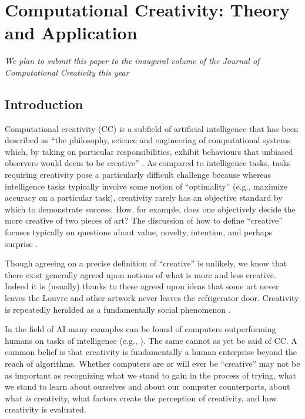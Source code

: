 \documentclass[phd,electronic,oneside,twosidetoc,letterpaper,chaptercenter,parttop,lol,lof,lot]{byumsphd}
\begin{document}
\chapter{Computational Creativity: Theory and Application}

\emph{We plan to submit this paper to the inaugural volume of the Journal of Computational Creativity this year}

\section{Introduction}

Computational creativity (CC) is a subfield of artificial intelligence that has been described as ``the philosophy, science and engineering of computational systems which, by taking on particular responsibilities, exhibit behaviours that unbiased observers would deem to be creative'' \citep{colton2012computational}. As compared to intelligence tasks, tasks requiring creativity pose a particularly difficult challenge because whereas intelligence tasks typically involve some notion of ``optimality'' (e.g., maximize accuracy on a particular task), creativity rarely has an objective standard by which to demonstrate success. How, for example, does one objectively decide the more creative of two pieces of art? The discussion of how to define ``creative'' focuses typically on questions about value, novelty, intention, and perhaps surprise \citep{Boden2003TheEdition}. 

Though agreeing on a precise definition of ``creative'' is unlikely, we know that there exist generally agreed upon notions of what is more and less creative. Indeed it is (usually) thanks to these agreed upon ideas that some art never leaves the Louvre and other artwork never leaves the refrigerator door. Creativity is repeatedly heralded as a fundamentally social phenomenon \citep{csikszentmihalyi1997flow}.

In the field of AI many examples can be found of computers outperforming humans on tasks of intelligence (e.g., \cite{silver2016mastering}). The same cannot as yet be said of CC. A common belief is that creativity is fundamentally a human enterprise beyond the reach of algorithms. Whether computers are or will ever be ``creative'' may not be as important as recognizing what we stand to gain in the process of trying, what we stand to learn about ourselves and about our computer counterparts, about what \textit{is} creativity, what factors create the perception of creativity, and how creativity is evaluated.
\end{document}
